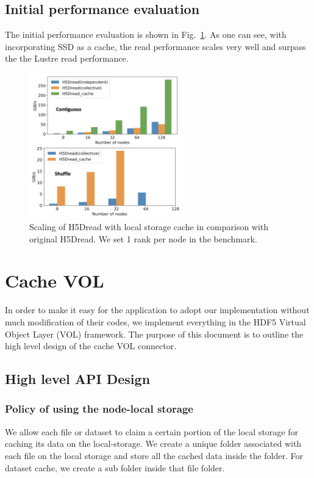 \documentclass[aps, rmp, 11pt, notitlepage]{revtex4-1}
\begin{document}
\subsection{Initial performance evaluation}
The initial performance evaluation is shown in Fig.~\ref{fig:perf_read}. As one can see, with incorporating SSD as a cache, the read performance scales very well and surpass the the Lustre read performance. 
\begin{figure}[hbt]
\centering
\includegraphics[width=0.6\textwidth]{perf_read.png}
\caption{Scaling of H5Dread with local storage cache in comparison with original H5Dread. We set 1 rank per node in the benchmark.}\label{fig:perf_read}
\end{figure}


\section{Cache VOL}
In order to make it easy for the application to adopt our implementation without much modification of their codes, we implement everything in the HDF5 Virtual Object Layer (VOL) framework. The purpose of this document is to outline the high level design of the cache VOL connector.

\subsection{High level API Design}

\subsubsection{Policy of using the node-local storage}
We allow each file or dataset to claim a certain portion of the local storage for caching its data on the local-storage. We create a unique folder associated with each file on the local storage and store all the cached data inside the folder. For dataset cache, we create a sub folder inside that file folder.
\end{document}
